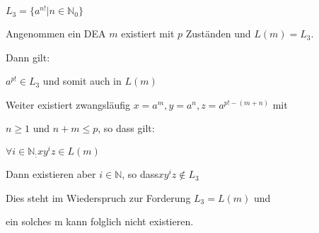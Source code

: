 $L_{3} = \{a^{n!}|n \in \mathbb{N}_{0}\}$

Angenommen ein DEA $m$ existiert mit $p$ Zuständen und $L(m) = L_{3}$.

Dann gilt:

$a^{p!} \in L_{3}$ und somit auch in $L(m)$

Weiter existiert zwangsläufig $x = a^{m}, y = a^{n}, z = a^{p!-(m+n)}$ mit

$n \geq 1$ und $n+m \leq p$, so dass gilt:

$\forall i \in \mathbb{N}_ : xy^{i}z \in L(m)$

Dann existieren aber $i \in \mathbb{N}$, so dass$xy^{i}z \not\in L_{3}$  

Dies steht im Wiederspruch zur Forderung $L_{3} = L(m)$ und 

ein solches m kann folglich  nicht existieren.
